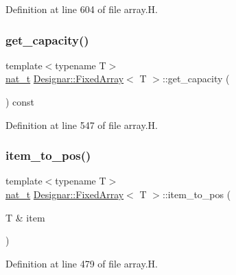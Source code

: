 Definition at line 604 of file array.\+H.

\mbox{\label{class_designar_1_1_fixed_array_ac262a6be77640c4da26cd49fe9b90db0}} 
\subsubsection{\texorpdfstring{get\+\_\+capacity()}{get\_capacity()}}
{\footnotesize\ttfamily template$<$typename T$>$ \\
\hyperlink{namespace_designar_aa72662848b9f4815e7bf31a7cf3e33d1}{nat\+\_\+t} \hyperlink{class_designar_1_1_fixed_array}{Designar\+::\+Fixed\+Array}$<$ T $>$\+::get\+\_\+capacity (\begin{DoxyParamCaption}{ }\end{DoxyParamCaption}) const\hspace{0.3cm}{\ttfamily [inline]}}



Definition at line 547 of file array.\+H.

\mbox{\label{class_designar_1_1_fixed_array_af1c7e826a704015eab8f3accac7ead7d}} 
\subsubsection{\texorpdfstring{item\+\_\+to\+\_\+pos()}{item\_to\_pos()}}
{\footnotesize\ttfamily template$<$typename T$>$ \\
\hyperlink{namespace_designar_aa72662848b9f4815e7bf31a7cf3e33d1}{nat\+\_\+t} \hyperlink{class_designar_1_1_fixed_array}{Designar\+::\+Fixed\+Array}$<$ T $>$\+::item\+\_\+to\+\_\+pos (\begin{DoxyParamCaption}\item[{T \&}]{item }\end{DoxyParamCaption})\hspace{0.3cm}{\ttfamily [inline]}}



Definition at line 479 of file array.\+H.


